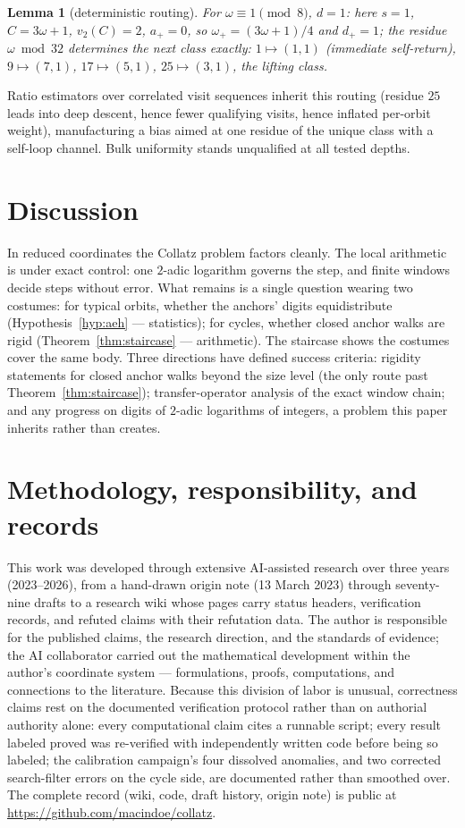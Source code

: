 \documentclass[11pt]{article}
\newtheorem{lemma}[theorem]{Lemma}
\theoremstyle{remark}
\newcommand{\vt}[1]{v_2\!\left(#1\right)}
\newcommand{\w}{\omega}
\newcommand{\wnext}{\w_{+}}
\newcommand{\dnext}{d_{+}}
\begin{document}
\begin{lemma}[deterministic routing]\label{lem:routing}
For $\w \equiv 1 \pmod 8$, $d = 1$: here $s = 1$, $C = 3\w + 1$, $\vt{C} = 2$, $a_+ = 0$, so $\wnext = (3\w+1)/4$ and $\dnext = 1$; the residue $\w \bmod 32$ determines the next class exactly: $1 \mapsto (1,1)$ (immediate self-return), $9 \mapsto (7,1)$, $17 \mapsto (5,1)$, $25 \mapsto (3,1)$, the lifting class.
\end{lemma}

Ratio estimators over correlated visit sequences inherit this routing (residue $25$ leads into deep descent, hence fewer qualifying visits, hence inflated per-orbit weight), manufacturing a bias aimed at one residue of the unique class with a self-loop channel. Bulk uniformity stands unqualified at all tested depths.

\section{Discussion}

In reduced coordinates the Collatz problem factors cleanly. The local arithmetic is under exact control: one $2$-adic logarithm governs the step, and finite windows decide steps without error. What remains is a single question wearing two costumes: for typical orbits, whether the anchors' digits equidistribute (Hypothesis~\ref{hyp:aeh} --- statistics); for cycles, whether closed anchor walks are rigid (Theorem~\ref{thm:staircase} --- arithmetic). The staircase shows the costumes cover the same body. Three directions have defined success criteria: rigidity statements for closed anchor walks beyond the size level (the only route past Theorem~\ref{thm:staircase}); transfer-operator analysis of the exact window chain; and any progress on digits of $2$-adic logarithms of integers, a problem this paper inherits rather than creates.

\appendix
\section{Methodology, responsibility, and records}\label{app:method}
This work was developed through extensive AI-assisted research over three years (2023--2026), from a hand-drawn origin note (13 March 2023) through seventy-nine drafts to a research wiki whose pages carry status headers, verification records, and refuted claims with their refutation data. The author is responsible for the published claims, the research direction, and the standards of evidence; the AI collaborator carried out the mathematical development within the author's coordinate system --- formulations, proofs, computations, and connections to the literature. Because this division of labor is unusual, correctness claims rest on the documented verification protocol rather than on authorial authority alone: every computational claim cites a runnable script; every result labeled proved was re-verified with independently written code before being so labeled; the calibration campaign's four dissolved anomalies, and two corrected search-filter errors on the cycle side, are documented rather than smoothed over. The complete record (wiki, code, draft history, origin note) is public at \url{https://github.com/macindoe/collatz}.
\end{document}
